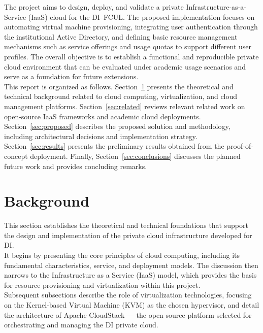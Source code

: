 \documentclass[sigplan]{acmart}
\begin{document}
    The project aims to design, deploy, and validate a private Infrastructure-as-a-Service (IaaS) cloud for the DI–FCUL. The proposed implementation focuses on automating virtual machine provisioning, integrating user authentication through the institutional Active Directory, and defining basic resource management mechanisms such as service offerings and usage quotas to support different user profiles. The overall objective is to establish a functional and reproducible private cloud environment that can be evaluated under academic usage scenarios and serve as a foundation for future extensions.\\
    
    This report is organized as follows. Section~\ref{sec:background} presents the theoretical and technical background related to cloud computing, virtualization, and cloud management platforms. Section~\ref{sec:related} reviews relevant related work on open-source IaaS frameworks and academic cloud deployments. Section~\ref{sec:proposed} describes the proposed solution and methodology, including architectural decisions and implementation strategy. Section~\ref{sec:results} presents the preliminary results obtained from the proof-of-concept deployment. Finally, Section~\ref{sec:conclusions} discusses the planned future work and provides concluding remarks.

\section{Background} \label{sec:background}
    This section establishes the theoretical and technical foundations that support the design and implementation of the private cloud infrastructure developed for DI.\\
    
    It begins by presenting the core principles of cloud computing, including its fundamental characteristics, service, and deployment models. The discussion then narrows to the Infrastructure as a Service (IaaS) model, which provides the basis for resource provisioning and virtualization within this project.\\
    
    Subsequent subsections describe the role of virtualization technologies, focusing on the Kernel-based Virtual Machine (KVM) as the chosen hypervisor, and detail the architecture of Apache CloudStack — the open-source platform selected for orchestrating and managing the DI private cloud.\\
    
\end{document}
